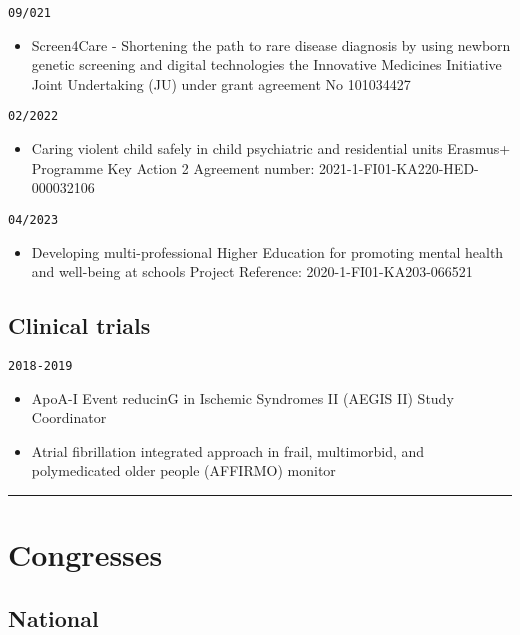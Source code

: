 \documentclass[
  12pt,
  letterpaper,
  DIV=11,
  numbers=noendperiod]{scrartcl}
\providecommand{\tightlist}{%
  \setlength{\itemsep}{0pt}\setlength{\parskip}{0pt}}\usepackage{longtable,booktabs,array}
\begin{document}
\texttt{09/021}

\begin{itemize}
\tightlist
\item
  Screen4Care - Shortening the path to rare disease diagnosis by using
  newborn genetic screening and digital technologies \textbar{} the
  Innovative Medicines Initiative \textbar{} Joint Undertaking (JU)
  under grant agreement No 101034427
\end{itemize}

\texttt{02/2022}

\begin{itemize}
\tightlist
\item
  Caring violent child safely in child psychiatric and residential units
  \textbar{} Erasmus+ Programme \textbar{} Key Action 2 \textbar{}
  Agreement number: 2021-1-FI01-KA220-HED-000032106
\end{itemize}

\texttt{04/2023}

\begin{itemize}
\tightlist
\item
  Developing multi-professional Higher Education for promoting mental
  health and well-being at schools \textbar{} Project Reference:
  2020-1-FI01-KA203-066521
\end{itemize}

\subsection{Clinical trials}\label{clinical-trials}

\texttt{2018-2019}

\begin{itemize}
\item
  ApoA-I Event reducinG in Ischemic Syndromes II (AEGIS II) \textbar{}
  Study Coordinator
\item
  Atrial fibrillation integrated approach in frail, multimorbid, and
  polymedicated older people (AFFIRMO) \textbar{} monitor
\end{itemize}

\begin{center}\rule{0.5\linewidth}{0.5pt}\end{center}

\section{Congresses}\label{congresses}

\subsection{National}\label{national-1}
\end{document}
